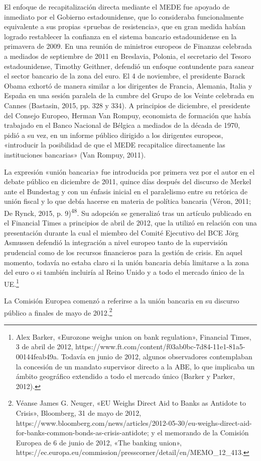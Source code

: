 \documentclass[10pt,a4paper]{article}
\begin{document}
{El enfoque de recapitalización directa mediante el MEDE fue apoyado de inmediato por el Gobierno estadounidense, que lo consideraba funcionalmente equivalente a sus propias «pruebas de resistencia», que en gran medida habían logrado restablecer la confianza en el sistema bancario estadounidense en la primavera de 2009. En una reunión de ministros europeos de Finanzas celebrada a mediados de septiembre de 2011 en Breslavia, Polonia, el secretario del Tesoro estadounidense, Timothy Geithner, defendió un enfoque contundente para sanear el sector bancario de la zona del euro. El 4 de noviembre, el presidente Barack Obama exhortó de manera similar a los dirigentes de Francia, Alemania, Italia y España en una sesión paralela de la cumbre del Grupo de los Veinte celebrada en Cannes (Bastasin, 2015, pp. 328 y 334). A principios de diciembre, el presidente del Consejo Europeo, Herman Van Rompuy, economista de formación que había trabajado en el Banco Nacional de Bélgica a mediados de la década de 1970, pidió a su vez, en un informe público dirigido a los dirigentes europeos, «introducir la posibilidad de que el MEDE recapitalice directamente las instituciones bancarias» (Van Rompuy, 2011).

La expresión «unión bancaria» fue introducida por primera vez por el autor en el debate público en diciembre de 2011, quince días después del discurso de Merkel ante el Bundestag y con un énfasis inicial en el paralelismo entre su retórica de unión fiscal y lo que debía hacerse en materia de política bancaria (Véron, 2011; De Rynck, 2015, p. 9)\textsuperscript{48}. Su adopción se generalizó tras un artículo publicado en el Financial Times a principios de abril de 2012, que la utilizó en relación con una presentación durante la cual el miembro del Comité Ejecutivo del BCE Jörg Asmussen defendió la integración a nivel europeo tanto de la supervisión prudencial como de los recursos financieros para la gestión de crisis. En aquel momento, todavía no estaba claro si la unión bancaria debía limitarse a la zona del euro o si también incluiría al Reino Unido y a todo el mercado único de la UE.\footnote{%
    Alex Barker, «Eurozone weighs union on bank regulation», Financial Times, 3 de abril de 2012, https://www.ft.com/content/f03ab0bc-7d84-11e1-81a5-00144feab49a. Todavía en junio de 2012, algunos observadores contemplaban la concesión de un mandato supervisor directo a la ABE, lo que implicaba un ámbito geográfico extendido a todo el mercado único (Barker y Parker, 2012).
}

La Comisión Europea comenzó a referirse a la unión bancaria en su discurso público a finales de mayo de 2012.\footnote{%
    Véanse James G. Neuger, «EU Weighs Direct Aid to Banks as Antidote to Crisis», Bloomberg, 31 de mayo de 2012, https://www.bloomberg.com/news/articles/2012-05-30/eu-weighs-direct-aid-for-banks-common-bonds-as-crisis-antidote; y el memorando de la Comisión Europea de 6 de junio de 2012, «The banking union», https://ec.europa.eu/commission/presscorner/detail/en/MEMO_12_413.
}

}
\end{document}

